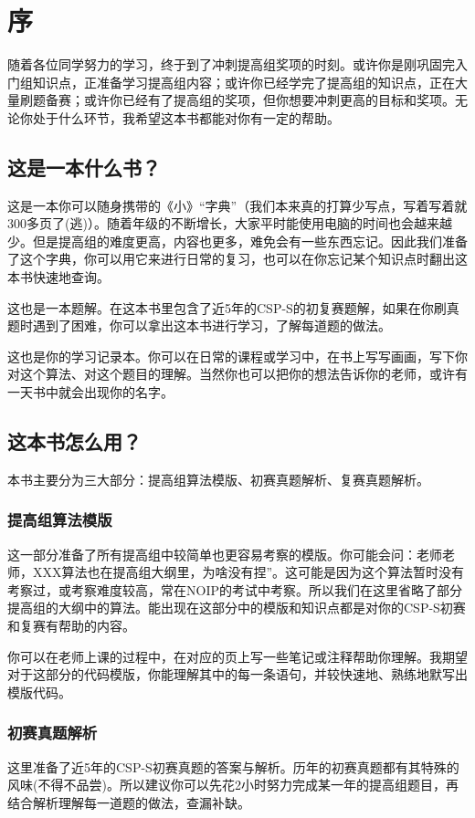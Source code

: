 \documentclass{book}
\title{\docTitle}
\author{\docAuthor}
\date{\docDate}
\begin{document}
\frontmatter

\chapter{序}
    随着各位同学努力的学习，终于到了冲刺提高组奖项的时刻。或许你是刚巩固完入门组知识点，正准备学习提高组内容；或许你已经学完了提高组的知识点，正在大量刷题备赛；或许你已经有了提高组的奖项，但你想要冲刺更高的目标和奖项。无论你处于什么环节，我希望这本书都能对你有一定的帮助。
\section*{这是一本什么书？}
    这是一本你可以随身携带的《小》“字典”（我们本来真的打算少写点，写着写着就300多页了(逃)）。随着年级的不断增长，大家平时能使用电脑的时间也会越来越少。但是提高组的难度更高，内容也更多，难免会有一些东西忘记。因此我们准备了这个字典，你可以用它来进行日常的复习，也可以在你忘记某个知识点时翻出这本书快速地查询。
    
    这也是一本题解。在这本书里包含了近5年的CSP-S的初复赛题解，如果在你刷真题时遇到了困难，你可以拿出这本书进行学习，了解每道题的做法。
    
    这也是你的学习记录本。你可以在日常的课程或学习中，在书上写写画画，写下你对这个算法、对这个题目的理解。当然你也可以把你的想法告诉你的老师，或许有一天书中就会出现你的名字。

\section*{这本书怎么用？}
    本书主要分为三大部分：提高组算法模版、初赛真题解析、复赛真题解析。
\subsection{提高组算法模版}
    这一部分准备了所有提高组中较简单也更容易考察的模版。你可能会问：老师老师，XXX算法也在提高组大纲里，为啥没有捏”。这可能是因为这个算法暂时没有考察过，或考察难度较高，常在NOIP的考试中考察。所以我们在这里省略了部分提高组的大纲中的算法。能出现在这部分中的模版和知识点都是对你的CSP-S初赛和复赛有帮助的内容。
    
你可以在老师上课的过程中，在对应的页上写一些笔记或注释帮助你理解。我期望对于这部分的代码模版，你能理解其中的每一条语句，并较快速地、熟练地默写出模版代码。
\subsection{初赛真题解析}
    这里准备了近5年的CSP-S初赛真题的答案与解析。历年的初赛真题都有其特殊的风味(不得不品尝)。所以建议你可以先花2小时努力完成某一年的提高组题目，再结合解析理解每一道题的做法，查漏补缺。
    
\end{document}
